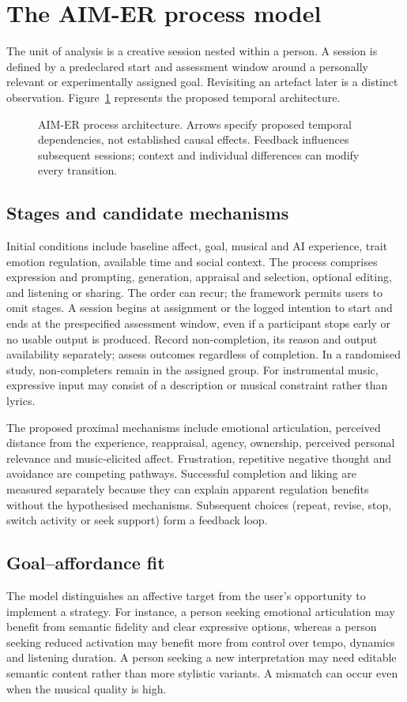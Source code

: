 \documentclass[11pt,a4paper]{article}
\begin{document}
\section{The AIM-ER process model}
The unit of analysis is a creative session nested within a person. A session is defined by a predeclared start and assessment window around a personally relevant or experimentally assigned goal. Revisiting an artefact later is a distinct observation. Figure~\ref{fig:aim} represents the proposed temporal architecture.

\begin{figure}[htbp]
\centering

\caption{AIM-ER process architecture. Arrows specify proposed temporal dependencies, not established causal effects. Feedback influences subsequent sessions; context and individual differences can modify every transition.}
\label{fig:aim}
\end{figure}

\subsection{Stages and candidate mechanisms}
Initial conditions include baseline affect, goal, musical and AI experience, trait emotion regulation, available time and social context. The process comprises expression and prompting, generation, appraisal and selection, optional editing, and listening or sharing. The order can recur; the framework permits users to omit stages. A session begins at assignment or the logged intention to start and ends at the prespecified assessment window, even if a participant stops early or no usable output is produced. Record non-completion, its reason and output availability separately; assess outcomes regardless of completion. In a randomised study, non-completers remain in the assigned group. For instrumental music, expressive input may consist of a description or musical constraint rather than lyrics.

The proposed proximal mechanisms include emotional articulation, perceived distance from the experience, reappraisal, agency, ownership, perceived personal relevance and music-elicited affect. Frustration, repetitive negative thought and avoidance are competing pathways. Successful completion and liking are measured separately because they can explain apparent regulation benefits without the hypothesised mechanisms. Subsequent choices (repeat, revise, stop, switch activity or seek support) form a feedback loop.

\subsection{Goal--affordance fit}
The model distinguishes an affective target from the user's opportunity to implement a strategy. For instance, a person seeking emotional articulation may benefit from semantic fidelity and clear expressive options, whereas a person seeking reduced activation may benefit more from control over tempo, dynamics and listening duration. A person seeking a new interpretation may need editable semantic content rather than more stylistic variants. A mismatch can occur even when the musical quality is high.
\end{document}
